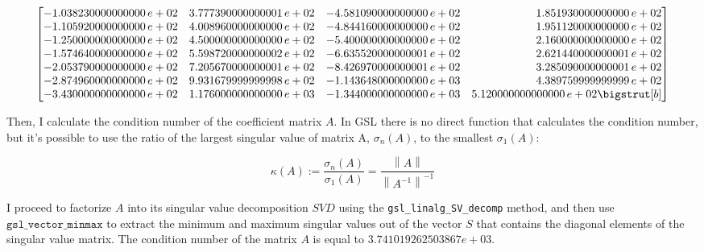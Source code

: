 \documentclass{article}
\newcommand{\code}{\texttt}
\newcommand{\norm}[1]{\left\lVert#1\right\rVert}
\begin{document}
\begin{adjustwidth}{-2em}{-2em}
\[{\begin{bmatrix*}[r]
-1.038230000000000\,e+02 & 3.777390000000001\,e+02 & -4.581090000000000\,e+02 & 1.851930000000000\,e+02 \\
-1.105920000000000\,e+02 & 4.008960000000000\,e+02 & -4.844160000000000\,e+02 & 1.951120000000000\,e+02 \\
-1.250000000000000\,e+02 & 4.500000000000000\,e+02 & -5.400000000000000\,e+02 & 2.160000000000000\,e+02 \\
-1.574640000000000\,e+02 & 5.598720000000002\,e+02 & -6.635520000000001\,e+02 & 2.621440000000001\,e+02 \\
-2.053790000000000\,e+02 & 7.205670000000001\,e+02 & -8.426970000000001\,e+02 & 3.285090000000001\,e+02 \\
-2.874960000000000\,e+02 & 9.931679999999998\,e+02 & -1.143648000000000\,e+03 & 4.389759999999999\,e+02 \\
-3.430000000000000\,e+02 & 1.176000000000000\,e+03 & -1.344000000000000\,e+03 & 5.120000000000000\,e+02 \bigstrut[b]
\end{bmatrix*}} \]%
\end{adjustwidth}

Then, I calculate the condition number of the coefficient matrix $A$. In GSL there is no direct function that calculates the condition number, but it's possible to use the ratio of the largest singular value of matrix A, $\sigma_n (A)$, to the smallest $\sigma_1 (A)$:

$$\kappa(A) := \frac{\sigma_n (A)}{\sigma_1 (A)}= \frac{\norm{A}}{\norm{A^{-1}}^{-1}}$$

I proceed to factorize $A$ into its singular value decomposition $SVD$ using the \code{gsl\_linalg\_SV\_decomp} method, and then use $\code{gsl\_vector\_minmax}$ to extract the minimum and maximum singular values out of the vector $S$ that contains the diagonal elements of the singular value matrix. The condition number of the matrix $A$ is equal to $3.741019262503867e+03$.\\

\end{document}
